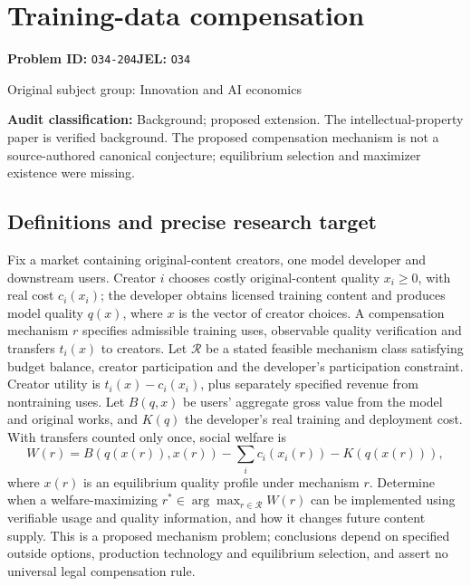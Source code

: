 \documentclass[11pt,a4paper]{article}
\begin{document}
\section*{Training-data compensation}
\textbf{Problem ID:} \texttt{O34-204}\quad \textbf{JEL:} \texttt{O34}\par
\label{problem:OP-0415}
{\sffamily\small\color{muted}Original subject group: Innovation and AI economics\par}
\label{definitions:problem:30007697}
\textbf{Audit classification:} Background; proposed extension. The intellectual-property paper is verified background. The proposed compensation mechanism is not a source-authored canonical conjecture; equilibrium selection and maximizer existence were missing.
\subsection*{Definitions and precise research target}
Fix a market containing original-content creators, one model developer and downstream users. Creator \(i\) chooses costly original-content quality \(x_i\geq0\), with real cost \(c_i(x_i)\); the developer obtains licensed training content and produces model quality \(q(x)\), where \(x\) is the vector of creator choices. A compensation mechanism \(r\) specifies admissible training uses, observable quality verification and transfers \(t_i(x)\) to creators. Let \(\mathcal R\) be a stated feasible mechanism class satisfying budget balance, creator participation and the developer's participation constraint. Creator utility is \(t_i(x)-c_i(x_i)\), plus separately specified revenue from nontraining uses. Let \(B(q,x)\) be users' aggregate gross value from the model and original works, and \(K(q)\) the developer's real training and deployment cost. With transfers counted only once, social welfare is
\[
W(r)=B(q(x(r)),x(r))-\sum_i c_i(x_i(r))-K(q(x(r))),
\]
where \(x(r)\) is an equilibrium quality profile under mechanism \(r\). Determine when a welfare-maximizing \(r^\ast\in\arg\max_{r\in\mathcal R}W(r)\) can be implemented using verifiable usage and quality information, and how it changes future content supply. This is a proposed mechanism problem; conclusions depend on specified outside options, production technology and equilibrium selection, and assert no universal legal compensation rule.
\end{document}
